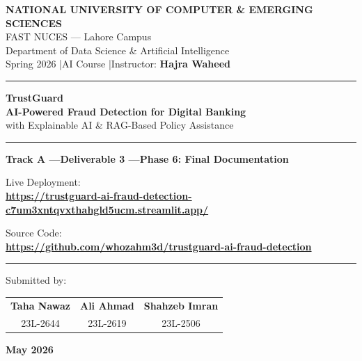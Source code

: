 \documentclass[12pt,a4paper]{article}
\begin{document}

\begin{titlepage}
\centering
\vspace*{0.6cm}

{\large\bfseries NATIONAL UNIVERSITY OF COMPUTER \& EMERGING SCIENCES}\\[4pt]
{\normalsize FAST NUCES --- Lahore Campus}\\[2pt]
{\normalsize Department of Data Science \& Artificial Intelligence}\\[2pt]
{\normalsize Spring 2026 \quad|\quad AI Course \quad|\quad Instructor: \textbf{Hajra Waheed}}

\vfill

{\color{TGBlue}\rule{0.8\linewidth}{1.5pt}}
\vspace{0.7cm}

{\Huge\bfseries\color{TGBlue} TrustGuard}\\[8pt]
{\Large\bfseries AI-Powered Fraud Detection for Digital Banking}\\[5pt]
{\large with Explainable AI \& RAG-Based Policy Assistance}

\vspace{0.5cm}
{\color{TGAccent}\rule{0.5\linewidth}{0.8pt}}
\vspace{0.5cm}

{\normalsize\bfseries Track A \quad---\quad Deliverable 3 \quad---\quad Phase 6: Final Documentation}

\vfill

{\normalsize\color{TGGray} Live Deployment:}\\[5pt]
{\small\bfseries\color{TGBlue}
  \href{https://trustguard-ai-fraud-detection-c7um3xntqvxthahgld5ucm.streamlit.app/}{%
    https://trustguard-ai-fraud-detection-c7um3xntqvxthahgld5ucm.streamlit.app/}}

\vspace{0.4cm}
{\normalsize\color{TGGray} Source Code:}\\[5pt]
{\small\bfseries\color{TGBlue}
  \href{https://github.com/whozahm3d/trustguard-ai-fraud-detection}{%
    https://github.com/whozahm3d/trustguard-ai-fraud-detection}}

\vfill

{\color{TGBlue}\rule{0.8\linewidth}{0.8pt}}
\vspace{0.5cm}

{\normalsize\color{TGGray} Submitted by:}\\[10pt]
\begin{tabular}{ccc}
{\large\bfseries Taha Nawaz} & {\large\bfseries Ali Ahmad} & {\large\bfseries Shahzeb Imran}\\[6pt]
{\normalsize 23L-2644}       & {\normalsize 23L-2619}       & {\normalsize 23L-2506}\\
\end{tabular}

\vspace{0.6cm}
{\normalsize\bfseries May 2026}

\end{titlepage}
\end{document}
